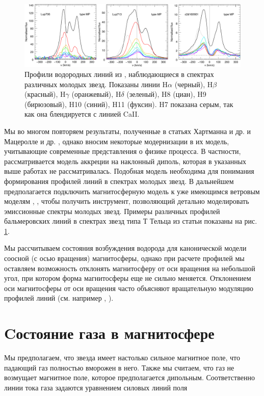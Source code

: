 \documentclass[12pt]{article}
\begin{document}
\begin{figure}[h] 
\centering
\includegraphics[width=\textwidth]{profiles.png}
\caption{Профили водородных линий из \cite{antoniucci17}, наблюдающиеся в спектрах различных молодых звезд. Показаны линии $\text{H}\alpha$ (черный), $\text{H}\beta$ (красный), $\text{H}\gamma$ (оранжевый), $\text{H}\delta$ (зеленый), H8 (циан), H9 (бирюзовый), H10 (синий), H11 (фуксин). H7 показана серым, так как она блендируется с линией CaII. }
\label{fig:profiles}
\end{figure}

Мы во многом повторяем результаты, полученные в статьях Хартманна и др. \cite{hartmann94} и Мацеролле и др. \cite{muzerolle01}, однако вносим некоторые модернизации в их модель, учитывающие современные представления о физике процесса. В частности, рассматривается модель аккреции на наклонный диполь, которая в указанных выше работах не рассматривалась. Подобная модель необходима для понимания формирования профилей линий в спектрах молодых звезд. В дальнейшем предполагается подключить магнитосферную модель к уже имеющимся ветровым моделям \cite{tambovtseva14}, \cite{grinin11}, чтобы получить инструмент, позволяющий детально моделировать эмиссионные спектры молодых звезд. Примеры различных профилей бальмеровских линий в спектрах звезд типа Т Тельца из статьи \cite{antoniucci17} показаны на рис. \ref{fig:profiles}.

Мы рассчитываем состояния возбуждения водорода для канонической модели соосной (с осью вращения) магнитосферы, однако при расчете профилей мы оставляем возможность отклонять магнитосферу от оси вращения на небольшой угол, при котором форма магнитосферы еще не сильно меняется. Отклонением оси магнитосферы от оси вращения часто объясняют вращательную модуляцию профилей линий (см. например \cite{bouvier99}, \cite{petrov01}).

\section{Cостояние газа в магнитосфере}

Мы предполагаем, что звезда имеет настолько сильное магнитное поле, что падающий газ полностью вморожен в него. Также мы считаем, что газ не возмущает магнитное поле, которое предполагается дипольным. Соответственно линии тока газа задаются уравнением силовых линий поля
\end{document}

